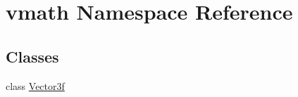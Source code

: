 \hypertarget{namespacevmath}{
\section{vmath Namespace Reference}
\label{namespacevmath}
}
\subsection*{Classes}
\begin{DoxyCompactItemize}
\item 
class \hyperlink{classvmath_1_1Vector3f}{Vector3f}
\end{DoxyCompactItemize}
